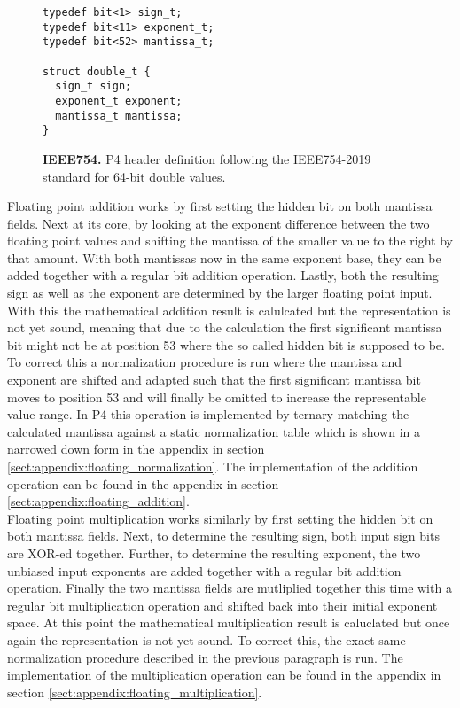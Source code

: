 \captionsetup[figure]{skip=-10pt} %
\begin{figure}[ht]
  \begin{lstlisting}[style=P4, basicstyle=\ttfamily]
typedef bit<1> sign_t;
typedef bit<11> exponent_t;
typedef bit<52> mantissa_t;

struct double_t {
  sign_t sign;
  exponent_t exponent;
  mantissa_t mantissa;
}\end{lstlisting}
  \caption[Double header definition in P4]{
    \textbf{IEEE754.} P4 header definition following the IEEE754-2019 standard for 64-bit double values.
  }
  \label{fig:double_header}
\end{figure}

Floating point addition works by first setting the hidden bit on both mantissa fields. Next at its core, by looking at the exponent difference between the two floating point values and shifting the mantissa of the smaller value to the right by that amount. With both mantissas now in the same exponent base, they can be added together with a regular bit addition operation. Lastly, both the resulting sign as well as the exponent are determined by the larger floating point input. With this the mathematical addition result is calulcated but the representation is not yet sound, meaning that due to the calculation the first significant mantissa bit might not be at position 53 where the so called hidden bit is supposed to be. To correct this a normalization procedure is run where the mantissa and exponent are shifted and adapted such that the first significant mantissa bit moves to position 53 and will finally be omitted to increase the representable value range. In P4 this operation is implemented by ternary matching the calculated mantissa against a static normalization table which is shown in a narrowed down form in the appendix in section \ref{sect:appendix:floating_normalization}. The implementation of the addition operation can be found in the appendix in section \ref{sect:appendix:floating_addition}.\\

Floating point multiplication works similarly by first setting the hidden bit on both mantissa fields. Next, to determine the resulting sign, both input sign bits are XOR-ed together. Further, to determine the resulting exponent, the two unbiased input exponents are added together with a regular bit addition operation. Finally the two mantissa fields are mutliplied together this time with a regular bit multiplication operation and shifted back into their initial exponent space. At this point the mathematical multiplication result is caluclated but once again the representation is not yet sound. To correct this, the exact same normalization procedure described in the previous paragraph is run. The implementation of the multiplication operation can be found in the appendix in section \ref{sect:appendix:floating_multiplication}.\\

